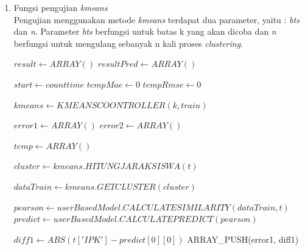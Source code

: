 \begin{enumerate}
    \item Fungsi pengujian \textit{kmeans}\\
        Pengujian menggunakan metode \textit{kmeans} terdapat dua parameter, yaitu : \textit{bts} dan \textit{n}. Parameter \textit{bts} berfungsi untuk batas k yang akan dicoba dan \textit{n} berfungsi untuk mengulang sebanyak n kali proses \textit{clustering}.
        
        \begin{algorithm}[H]
            \begin{algorithmic}[1]
                   \State $result \gets ARRAY()$
                   \State $resultPred \gets ARRAY()$
                   
                        \State $start \gets count time$
                        \State $tempMae \gets 0$
                        \State $tempRmse \gets 0$
                        
                            \State $kmeans \gets KMEANSCOONTROLLER(k, train)$
                            
                            \State $error1 \gets ARRAY()$
                            \State $error2 \gets ARRAY()$
                            
                                    \State $temp \gets ARRAY()$
                                    
                                    \State $cluster \gets kmeans.HITUNGJARAKSISWA(t)$
                                    
                                    \State $dataTrain \gets kmeans.GETCLUSTER(cluster)$
                                    
                                    \State $pearson \gets userBasedModel.CALCULATESIMILARITY(dataTrain, t)$
                                    \State $predict \gets userBasedModel.CALCULATEPREDICT(pearson)$
                                    
                                        \State $diff1 \gets ABS(t['IPK'] - predict[0][0])$
                                        \State ARRAY\_PUSH(error1, diff1)
                                        

\end{algorithmic}
\end{algorithm}
\end{enumerate}
